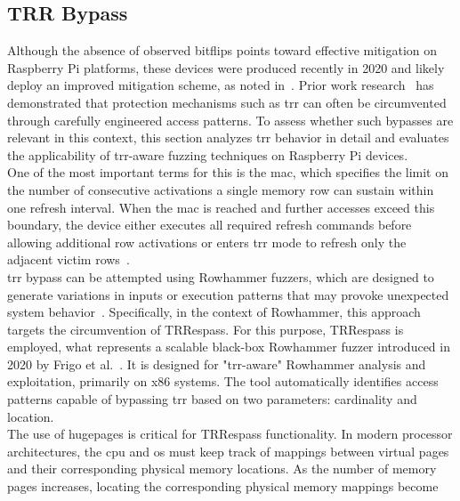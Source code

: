     \subsection{TRR Bypass} \label{subsec:trr-bypass}
        Although the absence of observed bitflips points toward effective mitigation on Raspberry Pi platforms, 
        these devices were produced recently in 2020 and likely deploy an improved mitigation scheme, as noted in~\cite{paperBlacksmith}.
        Prior work research~\cite{paperHalfDouble, paperTRRespass, paperBlacksmith, paperTRRScope} 
        has demonstrated that protection mechanisms such as \gls{trr} can 
        often be circumvented through carefully engineered access patterns. To assess whether such 
        bypasses are relevant in this context, this section analyzes \gls{trr} behavior in detail and evaluates 
        the applicability of \gls{trr}-aware fuzzing techniques on Raspberry Pi devices.
        \\
        One of the most important terms for this is the \gls{mac}, which specifies the limit on the number of
        consecutive activations a single memory row can sustain within one refresh interval. When 
        the \gls{mac} is reached and further accesses exceed this boundary, the device either executes all 
        required refresh commands before allowing additional row activations or enters \gls{trr} mode to refresh only 
        the adjacent victim rows~\cite{paperTRRScope,datasheetLPDDR4}.
        \\
        \gls{trr} bypass can be attempted using Rowhammer fuzzers, which are designed to generate variations in 
        inputs or execution patterns that may provoke unexpected system behavior~\cite{webFuzzTests, webFuzzing}. Specifically, 
        in the context of Rowhammer, this approach targets the circumvention of TRRespass. For this purpose, 
        TRRespass is employed, what represents a scalable black-box Rowhammer fuzzer introduced in 2020 by 
        Frigo et al.~\cite{paperTRRespass}. It is designed for "\gls{trr}-aware" Rowhammer analysis and exploitation, primarily on 
        x86 systems. The tool automatically identifies access patterns capable of bypassing \gls{trr} based on two 
        parameters: cardinality and location.
        \\
        The use of hugepages is critical for TRRespass functionality. In modern processor architectures, the 
        \gls{cpu} and \gls{os} must keep track of mappings between virtual pages and their corresponding physical 
        memory locations. As the number of memory pages increases, locating the corresponding physical memory mappings become
